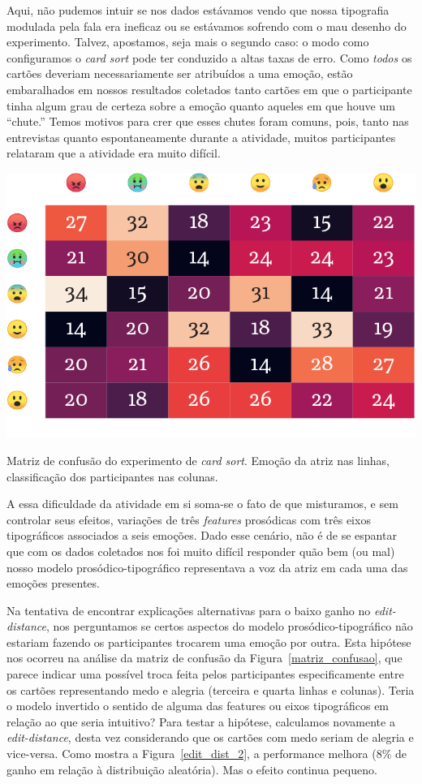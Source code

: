 \documentclass[a4paper]{tufte-handout}
\begin{document}
Aqui, não pudemos intuir se nos dados estávamos vendo que nossa tipografia modulada pela fala era ineficaz ou se estávamos sofrendo com o mau desenho do experimento. Talvez, apostamos, seja mais o segundo caso: o modo como configuramos o \textit{card sort} pode ter conduzido a altas taxas de erro. Como \textit{todos} os cartões deveriam necessariamente ser atribuídos a uma emoção, estão embaralhados em nossos resultados coletados tanto cartões em que o participante tinha algum grau de certeza sobre a emoção quanto aqueles em que houve um ``chute.'' Temos motivos para crer que esses chutes foram comuns, pois, tanto nas entrevistas quanto espontaneamente durante a atividade, muitos participantes relataram que a atividade era muito difícil.

\begin{marginfigure}
  \includegraphics{imgs/confusion-emoji2.png}
  \caption{Matriz de confusão do experimento de \textit{card sort}. Emoção da atriz nas linhas, classificação dos participantes nas colunas.}
  \label{matriz_confusao}
\end{marginfigure}

A essa dificuldade da atividade em si soma-se o fato de que misturamos, e sem controlar seus efeitos, variações de três \textit{features} prosódicas com três eixos tipográficos associados a seis emoções. Dado esse cenário, não é de se espantar que com os dados coletados nos foi muito difícil responder quão bem (ou mal) nosso modelo prosódico-tipográfico representava a voz da atriz em cada uma das emoções presentes. 

Na tentativa de encontrar explicações alternativas para o baixo ganho no \textit{edit-distance}, nos perguntamos se certos aspectos do modelo prosódico-tipográfico não estariam fazendo os participantes trocarem uma emoção por outra. Esta hipótese nos ocorreu na análise da matriz de confusão da Figura~\ref{matriz_confusao}, que parece indicar uma possível troca feita pelos participantes especificamente entre os cartões representando medo e alegria (terceira e quarta linhas e colunas). Teria o modelo invertido o sentido de alguma das features ou eixos tipográficos em relação ao que seria intuitivo? Para testar a hipótese, calculamos novamente a \textit{edit-distance}, desta vez considerando que os cartões com medo seriam de alegria e vice-versa. Como mostra a Figura~\ref{edit_dist_2}, a performance melhora (8\% de ganho em relação à distribuição aleatória). Mas o efeito continua pequeno.
\end{document}

